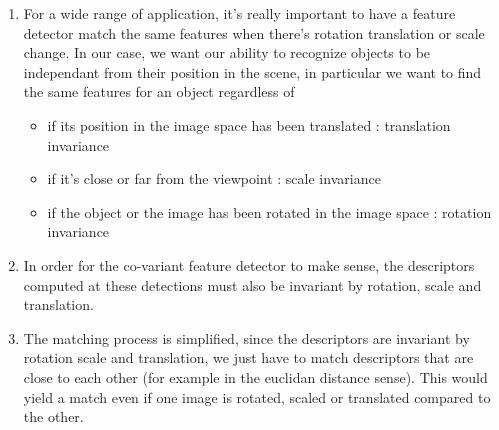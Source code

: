 \documentclass{article}
\begin{document}
\begin{enumerate}
\item For a wide range of application, it's really important to have a
  feature detector match the same features when there's rotation
  translation or scale change.  In our case, %
  we want our ability
  to recognize objects to be independant from their position in the
  scene, in particular we want to find the same features for an
  object regardless of
  \begin{itemize}
    \item if its position in the image space has been translated : translation invariance
    \item if it's close or far from the viewpoint : scale invariance
    \item if the object or the image has been rotated in the image space : rotation invariance
  \end{itemize}





\item In order for the co-variant feature detector to make sense, the
descriptors computed at these detections must also be invariant
by rotation, scale and translation.

\item The matching process is simplified, since the descriptors are
  invariant by rotation scale and translation, we just have to match
  descriptors that are close to each other (for example in the
  euclidan distance sense). This would yield a match even if one image
  is rotated, scaled or translated compared to the other.

\end{enumerate}
\end{document}
